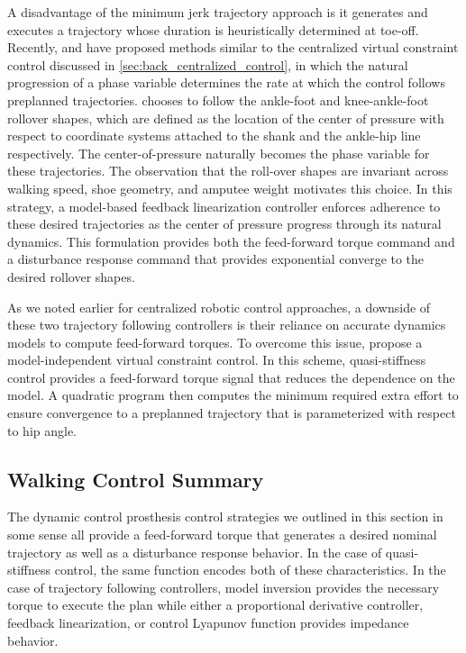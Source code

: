 A disadvantage of the minimum jerk trajectory approach is it generates and
executes a trajectory whose duration is heuristically determined at toe-off.
Recently, \citet{gregg2014virtual} and \citet{zhao2016first} have proposed
methods similar to the centralized virtual constraint control discussed in
\cref{sec:back_centralized_control}, in which the natural progression of a phase
variable determines the rate at which the control follows preplanned
trajectories. \citet{gregg2014virtual} chooses to follow the ankle-foot and
knee-ankle-foot rollover shapes, which are defined as the location of the center
of pressure with respect to coordinate systems attached to the shank and the
ankle-hip line respectively. The center-of-pressure naturally becomes the phase
variable for these trajectories. The observation that the roll-over shapes are
invariant across walking speed, shoe geometry, and amputee weight motivates this
choice. In this strategy, a model-based feedback linearization controller
enforces adherence to these desired trajectories as the center of pressure
progress through its natural dynamics. This formulation provides both the
feed-forward torque command and a disturbance response command that provides
exponential converge to the desired rollover shapes. 

As we noted earlier for centralized robotic control approaches, a downside of
these two trajectory following controllers is their reliance on accurate
dynamics models to compute feed-forward torques. To overcome this issue,
\citet{zhao2016first} propose a model-independent virtual constraint control. In
this scheme, quasi-stiffness control provides a feed-forward torque signal that
reduces the dependence on the model. A quadratic program then computes the
minimum required extra effort to ensure convergence to a preplanned trajectory
that is parameterized with respect to hip angle.

\subsection{Walking Control Summary}

The dynamic control prosthesis control strategies we outlined in this section in
some sense all provide a feed-forward torque that generates a desired nominal
trajectory as well as a disturbance response behavior. In the case of
quasi-stiffness control, the same function encodes both of these
characteristics. In the case of trajectory following controllers, model
inversion provides the necessary torque to execute the plan while either a
proportional derivative controller, feedback linearization, or control Lyapunov
function provides impedance behavior.  

